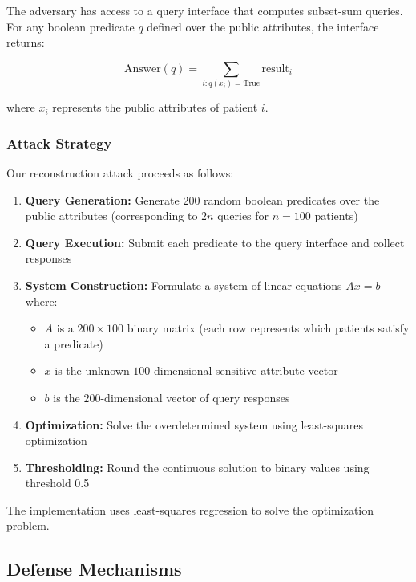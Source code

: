 \documentclass[11pt,letterpaper]{article}
\begin{document}
The adversary has access to a query interface that computes subset-sum queries. For any boolean predicate $q$ defined over the public attributes, the interface returns:

\begin{equation}
    \text{Answer}(q) = \sum_{i: q(x_i) = \text{True}} \text{result}_i
\end{equation}

where $x_i$ represents the public attributes of patient $i$.

\subsubsection{Attack Strategy}

Our reconstruction attack proceeds as follows:

\begin{enumerate}[leftmargin=*]
    \item \textbf{Query Generation:} Generate 200 random boolean predicates over the public attributes (corresponding to $2n$ queries for $n=100$ patients)
    \item \textbf{Query Execution:} Submit each predicate to the query interface and collect responses
    \item \textbf{System Construction:} Formulate a system of linear equations $Ax = b$ where:
    \begin{itemize}
        \item $A$ is a $200 \times 100$ binary matrix (each row represents which patients satisfy a predicate)
        \item $x$ is the unknown $100$-dimensional sensitive attribute vector
        \item $b$ is the $200$-dimensional vector of query responses
    \end{itemize}
    \item \textbf{Optimization:} Solve the overdetermined system using least-squares optimization
    \item \textbf{Thresholding:} Round the continuous solution to binary values using threshold 0.5
\end{enumerate}

The implementation uses least-squares regression to solve the optimization problem.

\subsection{Defense Mechanisms}
\end{document}
